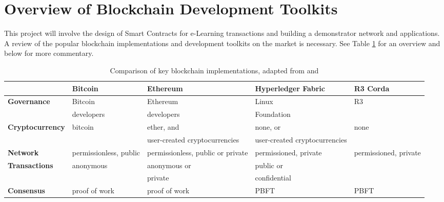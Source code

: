 \section{Overview of Blockchain Development Toolkits}

This project will involve the design of Smart Contracts for e-Learning transactions and building a demonstrator
network and applications. A review of the popular blockchain implementations and development toolkits on the
market is necessary. See Table \ref{table:blockchainscomparison} for an overview and below for more commentary.

\begin{table}[!ht]
	\caption[Comparison of key blockchain implementations, eg. Ethereum, Fabric, R3]
	{Comparison of key blockchain implementations, adapted from \citet{ibm2018hyperledger} and \citet{valenta2017comparison}}
	\centering
	\label{table:blockchainscomparison}
	\begin{tabularx}{\textwidth}{>{\bfseries}lXXXX}
		\toprule
		                & \textbf{Bitcoin}       & \textbf{Ethereum}                 & \textbf{Hyperledger Fabric}   & \textbf{R3 Corda}     \\
		\midrule
		Governance      & Bitcoin                & Ethereum                          & Linux                         & R3                    \\
		                & developers             & developers                        & Foundation                                            \\
		\midrule
		Cryptocurrency  & bitcoin                & ether, and                        & none, or                      & none                  \\
		                &                        & user-created cryptocurrencies     & user-created cryptocurrencies &                       \\
		\midrule
		Network         & permissionless, public & permissionless, public or private & permissioned, private         & permissioned, private \\
		\midrule
		Transactions    & anonymous              & anonymous or                      & public or                     &                       \\
		                &                        & private                           & confidential                  &                       \\
		\midrule
		Consensus       & proof of work          & proof of work                     & PBFT                          & PBFT                  \\

\end{tabularx}
\end{table}
